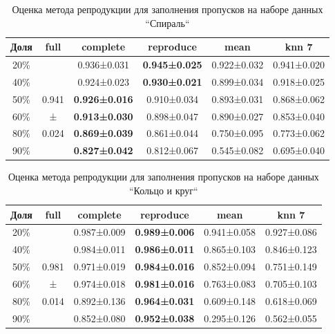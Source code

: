 \begin{table} [htbp]
    \centering
    \begin{threeparttable}
        \caption{Оценка метода репродукции для заполнения пропусков на наборе данных ``Спираль``}\label{tab:missing_results_spiral}
        \begin{SingleSpace}
        \begin{tabular}{|c|c|c|c|c|c|}
            \hline
            Доля & full & complete & reproduce & mean & knn 7 \\
            \hline
            20\% &       & 0.936±0.031 & \textbf{0.945±0.025} & 0.922±0.032 & 0.941±0.020 \\
            40\% &       & 0.924±0.023 & \textbf{0.930±0.021} & 0.899±0.034 & 0.918±0.025 \\
            50\% & 0.941 & \textbf{0.926±0.016} & 0.910±0.034 & 0.893±0.031 & 0.868±0.062 \\
            60\% &   ±   & \textbf{0.913±0.030} & 0.898±0.047 & 0.890±0.027 & 0.853±0.040 \\
            80\% & 0.024 & \textbf{0.869±0.039} & 0.861±0.044 & 0.750±0.095 & 0.773±0.062 \\
            90\% &       & \textbf{0.827±0.042} & 0.812±0.067 & 0.545±0.082 & 0.695±0.040 \\
            \hline
        \end{tabular}
        \end{SingleSpace}
    \end{threeparttable}
\end{table}

\begin{table} [htbp]
    \centering
    \begin{threeparttable}
        \caption{Оценка метода репродукции для заполнения пропусков на наборе данных ``Кольцо и круг``}\label{tab:missing_results_circle}
        \begin{SingleSpace}
        \begin{tabular}{|c|c|c|c|c|c|}
            \hline
            Доля & full & complete & reproduce & mean & knn 7 \\
            \hline
            20\% &       & 0.987±0.009 & \textbf{0.989±0.006} & 0.941±0.058 & 0.927±0.086 \\
            40\% &       & 0.984±0.011 & \textbf{0.986±0.011} & 0.865±0.103 & 0.846±0.123 \\
            50\% & 0.981 & 0.971±0.019 & \textbf{0.984±0.016} & 0.852±0.094 & 0.751±0.149 \\
            60\% &   ±   & 0.974±0.018 & \textbf{0.981±0.016} & 0.763±0.083 & 0.705±0.103 \\
            80\% & 0.014 & 0.892±0.136 & \textbf{0.964±0.031} & 0.609±0.148 & 0.618±0.069 \\
            90\% &       & 0.852±0.080 & \textbf{0.952±0.038} & 0.295±0.126 & 0.562±0.055 \\
            \hline
        \end{tabular}
        \end{SingleSpace}
    \end{threeparttable}
\end{table}